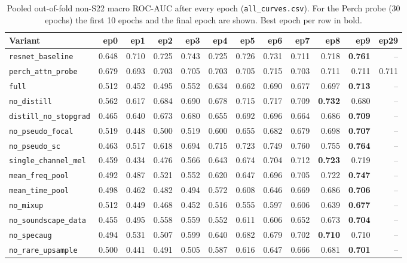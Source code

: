 \begin{table}[H]\centering\scriptsize
\caption{Pooled out-of-fold non-S22 macro ROC-AUC after every epoch (\texttt{all\_curves.csv}). For the Perch probe (30 epochs) the first 10 epochs and the final epoch are shown. Best epoch per row in bold.}
\label{tab:curve}
\setlength{\tabcolsep}{2.5pt}
\begin{adjustbox}{max width=\linewidth}
\begin{tabular}{lrrrrrrrrrrr}
\toprule
Variant & ep0 & ep1 & ep2 & ep3 & ep4 & ep5 & ep6 & ep7 & ep8 & ep9 & ep29 \\
\midrule
\texttt{resnet\_baseline} & 0.648 & 0.710 & 0.725 & 0.743 & 0.725 & 0.726 & 0.731 & 0.711 & 0.718 & \textbf{0.761} & -- \\
\texttt{perch\_attn\_probe} & 0.679 & 0.693 & 0.703 & 0.705 & 0.703 & 0.705 & 0.715 & 0.703 & 0.711 & 0.711 & 0.711 \\
\texttt{full} & 0.512 & 0.452 & 0.495 & 0.552 & 0.634 & 0.662 & 0.690 & 0.677 & 0.697 & \textbf{0.713} & -- \\
\texttt{no\_distill} & 0.562 & 0.617 & 0.684 & 0.690 & 0.678 & 0.715 & 0.717 & 0.709 & \textbf{0.732} & 0.680 & -- \\
\texttt{distill\_no\_stopgrad} & 0.465 & 0.640 & 0.673 & 0.680 & 0.655 & 0.692 & 0.696 & 0.664 & 0.686 & \textbf{0.709} & -- \\
\texttt{no\_pseudo\_focal} & 0.519 & 0.448 & 0.500 & 0.519 & 0.600 & 0.655 & 0.682 & 0.679 & 0.698 & \textbf{0.707} & -- \\
\texttt{no\_pseudo\_sc} & 0.463 & 0.517 & 0.618 & 0.694 & 0.715 & 0.723 & 0.749 & 0.760 & 0.755 & \textbf{0.764} & -- \\
\texttt{single\_channel\_mel} & 0.459 & 0.434 & 0.476 & 0.566 & 0.643 & 0.674 & 0.704 & 0.712 & \textbf{0.723} & 0.719 & -- \\
\texttt{mean\_freq\_pool} & 0.492 & 0.487 & 0.521 & 0.552 & 0.620 & 0.647 & 0.696 & 0.705 & 0.722 & \textbf{0.747} & -- \\
\texttt{mean\_time\_pool} & 0.498 & 0.462 & 0.482 & 0.494 & 0.572 & 0.608 & 0.646 & 0.669 & 0.686 & \textbf{0.706} & -- \\
\texttt{no\_mixup} & 0.512 & 0.449 & 0.468 & 0.452 & 0.516 & 0.555 & 0.597 & 0.606 & 0.639 & \textbf{0.677} & -- \\
\texttt{no\_soundscape\_data} & 0.455 & 0.495 & 0.558 & 0.559 & 0.552 & 0.611 & 0.606 & 0.652 & 0.673 & \textbf{0.704} & -- \\
\texttt{no\_specaug} & 0.494 & 0.531 & 0.507 & 0.599 & 0.640 & 0.682 & 0.679 & 0.702 & \textbf{0.710} & 0.710 & -- \\
\texttt{no\_rare\_upsample} & 0.500 & 0.441 & 0.491 & 0.505 & 0.587 & 0.616 & 0.647 & 0.666 & 0.681 & \textbf{0.701} & -- \\
\bottomrule
\end{tabular}
\end{adjustbox}
\end{table}
